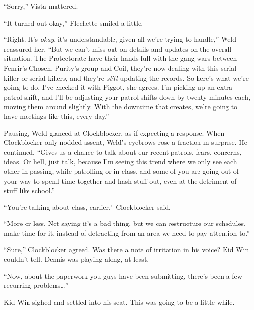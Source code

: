``Sorry,'' Vista muttered.



``It turned out okay,'' Flechette smiled a little.



``Right.  It's \emph{okay}, it's understandable, given all we're trying to handle,'' Weld reassured her, ``But we can't miss out on details and updates on the overall situation.  The Protectorate have their hands full with the gang wars between Fenrir's Chosen, Purity's group and Coil,  they're now dealing with this serial killer or serial killer\emph{s}, and they're \emph{still} updating the records.  So here's what we're going to do, I've checked it with Piggot, she agrees.  I'm picking up an extra patrol shift, and I'll be adjusting your patrol shifts down by twenty minutes each, moving them around slightly.  With the downtime that creates, we're going to have meetings like this, every day.''



Pausing, Weld glanced at Clockblocker, as if expecting a response.  When Clockblocker only nodded assent, Weld's eyebrows rose a fraction in surprise.  He continued, ``Gives us a chance to talk about our recent patrols, fears, concerns, ideas.  Or hell, just talk, because I'm seeing this trend where we only see each other in passing, while patrolling or in class, and some of you are going out of your way to spend time together and hash stuff out, even at the detriment of stuff like school.''



``You're talking about class, earlier,'' Clockblocker said.



``More or less.  Not saying it's a bad thing, but we can restructure our schedules, make time for it, instead of detracting from an area we need to pay attention to.''



``Sure,'' Clockblocker agreed.  Was there a note of irritation in his voice?  Kid Win couldn't tell.  Dennis was playing along, at least.



``Now, about the paperwork you guys have been submitting, there's been a few recurring problems\ldots''



Kid Win sighed and settled into his seat.  This was going to be a little while.



\sectionbreak



